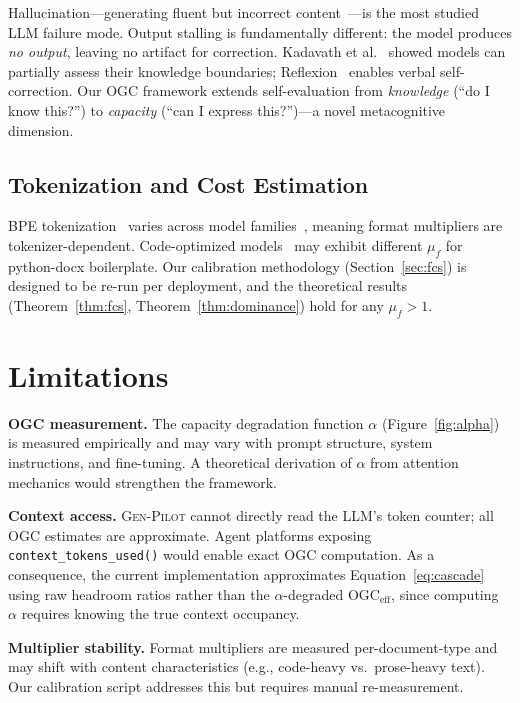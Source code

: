 \documentclass[11pt,twocolumn]{article}
\newcommand{\genpilot}{\textsc{Gen-Pilot}}
\newcommand{\ogceff}{\mathrm{OGC}_{\mathrm{eff}}}
\begin{document}
Hallucination---generating fluent but incorrect
content~\cite{ji2023hallucination,huang2023hallucination}---is
the most studied LLM failure mode.  Output stalling is
fundamentally different: the model produces \emph{no output},
leaving no artifact for correction.
Kadavath et al.~\cite{kadavath2022selfeval} showed models can
partially assess their knowledge boundaries;
Reflexion~\cite{shinn2023reflexion} enables verbal self-correction.
Our OGC framework extends self-evaluation from
\emph{knowledge} (``do I know this?'') to \emph{capacity}
(``can I express this?'')---a novel metacognitive dimension.

\subsection{Tokenization and Cost Estimation}

BPE tokenization~\cite{sennrich2016bpe} varies across model
families~\cite{brown2020gpt3,touvron2023llama}, meaning format
multipliers are tokenizer-dependent.  Code-optimized
models~\cite{chen2021codex} may exhibit different $\mu_f$ for
python-docx boilerplate.  Our calibration methodology
(Section~\ref{sec:fcs}) is designed to be re-run per deployment,
and the theoretical results (Theorem~\ref{thm:fcs},
Theorem~\ref{thm:dominance}) hold for any $\mu_f > 1$.


\section{Limitations}
\label{sec:limits}

\textbf{OGC measurement.}  The capacity degradation function
$\alpha$ (Figure~\ref{fig:alpha}) is measured empirically and
may vary with prompt structure, system instructions, and
fine-tuning.  A theoretical derivation of $\alpha$ from attention
mechanics would strengthen the framework.

\textbf{Context access.}  \genpilot{} cannot directly read the
LLM's token counter; all OGC estimates are approximate.  Agent
platforms exposing \texttt{context\_tokens\_used()} would enable
exact OGC computation.  As a consequence, the current
implementation approximates Equation~\ref{eq:cascade} using
raw headroom ratios rather than the $\alpha$-degraded
$\ogceff$, since computing $\alpha$ requires knowing the
true context occupancy.

\textbf{Multiplier stability.}  Format multipliers are measured
per-document-type and may shift with content characteristics
(e.g., code-heavy vs.\ prose-heavy text).  Our calibration
script addresses this but requires manual re-measurement.
\end{document}

